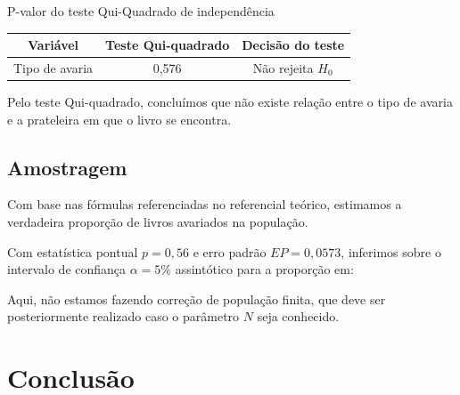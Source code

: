 \documentclass[a4paper, 12pt]{article}
\begin{document}
\begin{quadro}[H]
\centering
\caption{P-valor do teste Qui-Quadrado de independência}
\begin{tabular}{|c|c|c|}
\hline
\textbf{Variável} & \textbf{Teste Qui-quadrado} & \textbf{Decisão do teste} \\ \hline Tipo de avaria
 & 0,576       & Não rejeita $H_0$  \\ \hline  
\end{tabular}
\end{quadro}

Pelo teste Qui-quadrado, concluímos que não existe relação entre o tipo de avaria e a prateleira em que o livro se encontra.

\subsection{Amostragem}

Com base nas fórmulas referenciadas no referencial teórico, estimamos a verdadeira proporção de livros avariados na população.

Com estatística pontual $p=0,56$ e erro padrão $EP = 0,0573$, inferimos sobre o intervalo de confiança $\alpha = 5\%$ assintótico para a proporção em:


Aqui, não estamos fazendo correção de população finita, que deve ser posteriormente realizado caso o parâmetro $N$ seja conhecido.

\section{Conclusão}
\end{document}
